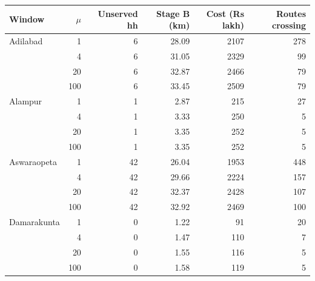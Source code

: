 \begin{tabular}{lrrrrr}
\hline
Window & $\mu$ & Unserved hh & Stage B (km) & Cost (Rs lakh) & Routes crossing \\
\hline
Adilabad & 1 & 6 & 28.09 & 2107 & 278 \\
 & 4 & 6 & 31.05 & 2329 & 99 \\
 & 20 & 6 & 32.87 & 2466 & 79 \\
 & 100 & 6 & 33.45 & 2509 & 79 \\
\hline
Alampur & 1 & 1 & 2.87 & 215 & 27 \\
 & 4 & 1 & 3.33 & 250 & 5 \\
 & 20 & 1 & 3.35 & 252 & 5 \\
 & 100 & 1 & 3.35 & 252 & 5 \\
\hline
Aswaraopeta & 1 & 42 & 26.04 & 1953 & 448 \\
 & 4 & 42 & 29.66 & 2224 & 157 \\
 & 20 & 42 & 32.37 & 2428 & 107 \\
 & 100 & 42 & 32.92 & 2469 & 100 \\
\hline
Damarakunta & 1 & 0 & 1.22 & 91 & 20 \\
 & 4 & 0 & 1.47 & 110 & 7 \\
 & 20 & 0 & 1.55 & 116 & 5 \\
 & 100 & 0 & 1.58 & 119 & 5 \\
\hline
\end{tabular}
